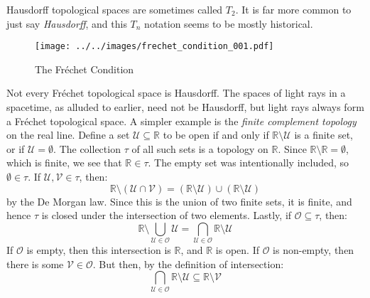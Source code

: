 \documentclass{article}
\theoremstyle{plain}
\theoremstyle{normal}
\newenvironment{example}{%
    \pushQED{\qed}\renewcommand{\qedsymbol}{$\blacksquare$}\examplex%
}{%
    \popQED\endexamplex%
}
\begin{document}
    Hausdorff topological spaces are sometimes called $T_{2}$. It is far
    more common to just say \textit{Hausdorff}, and this $T_{n}$ notation seems
    to be mostly historical.
    \begin{figure}
        \centering
        \texttt{[image: ../../images/frechet\_condition\_001.pdf]}
        \caption{The Fr\'{e}chet Condition}
        \label{fig:frechet_condition_001}
    \end{figure}
    \begin{example}[\textbf{Finite Complement Topology}]
        Not every Fr\'{e}chet topological space is Hausdorff. The spaces of
        light rays in a spacetime, as alluded to earlier, need not be
        Hausdorff, but light rays always form a Fr\'{e}chet topological
        space. A simpler example is the \textit{finite complement topology}
        on the real line. Define a set $\mathcal{U}\subseteq\mathbb{R}$ to be
        open if and only if $\mathbb{R}\setminus\mathcal{U}$ is a finite set,
        or if $\mathcal{U}=\emptyset$.
        The collection $\tau$ of all such sets is a topology on $\mathbb{R}$.
        Since $\mathbb{R}\setminus\mathbb{R}=\emptyset$, which is finite,
        we see that $\mathbb{R}\in\tau$. The empty set was intentionally
        included, so $\emptyset\in\tau$. If $\mathcal{U},\mathcal{V}\in\tau$,
        then:
        \begin{equation}
            \mathbb{R}\setminus(\mathcal{U}\cap\mathcal{V})=
                (\mathbb{R}\setminus\mathcal{U})\cup
                (\mathbb{R}\setminus\mathcal{U})
        \end{equation}
        by the De Morgan law. Since this is the union of two finite sets, it
        is finite, and hence $\tau$ is closed under the intersection of two
        elements. Lastly, if $\mathcal{O}\subseteq\tau$, then:
        \begin{equation}
            \mathbb{R}\setminus\bigcup_{\mathcal{U}\in\mathcal{O}}\mathcal{U}
            =\bigcap_{\mathcal{U}\in\mathcal{O}}\mathbb{R}\setminus\mathcal{U}
        \end{equation}
        If $\mathcal{O}$ is empty, then this intersection is $\mathbb{R}$,
        and $\mathbb{R}$ is open. If $\mathcal{O}$ is non-empty, then there is
        some $\mathcal{V}\in\mathcal{O}$. But then, by the definition of
        intersection:
        \begin{equation}
            \bigcap_{\mathcal{U}\in\mathcal{O}}\mathbb{R}\setminus\mathcal{U}
            \subseteq\mathbb{R}\setminus\mathcal{V}

\end{equation}
\end{example}
\end{document}
